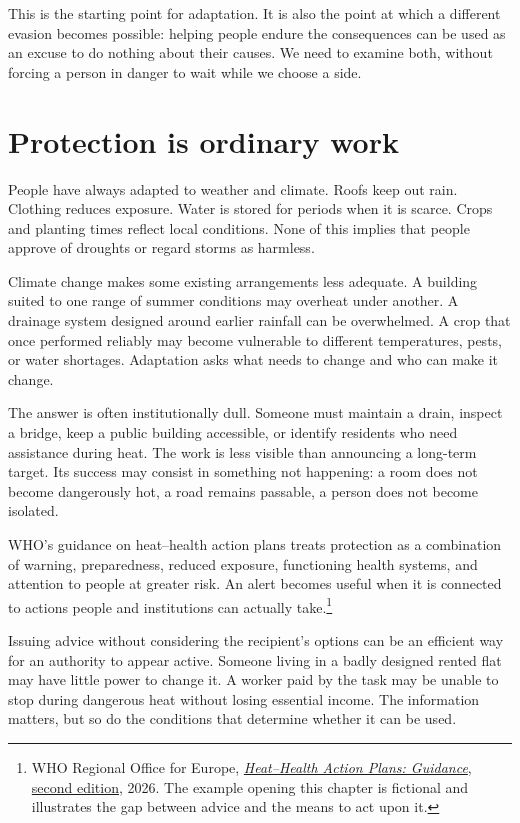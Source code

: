 \documentclass[12pt,a4paper]{book}
\begin{document}
This is the starting point for adaptation. It is also the point at which a different evasion becomes possible: helping people endure the consequences can be used as an excuse to do nothing about their causes. We need to examine both, without forcing a person in danger to wait while we choose a side.

\section*{Protection is ordinary work}

People have always adapted to weather and climate. Roofs keep out rain. Clothing reduces exposure. Water is stored for periods when it is scarce. Crops and planting times reflect local conditions. None of this implies that people approve of droughts or regard storms as harmless.

Climate change makes some existing arrangements less adequate. A building suited to one range of summer conditions may overheat under another. A drainage system designed around earlier rainfall can be overwhelmed. A crop that once performed reliably may become vulnerable to different temperatures, pests, or water shortages. Adaptation asks what needs to change and who can make it change.

The answer is often institutionally dull. Someone must maintain a drain, inspect a bridge, keep a public building accessible, or identify residents who need assistance during heat. The work is less visible than announcing a long-term target. Its success may consist in something not happening: a room does not become dangerously hot, a road remains passable, a person does not become isolated.

WHO's guidance on heat--health action plans treats protection as a combination of warning, preparedness, reduced exposure, functioning health systems, and attention to people at greater risk. An alert becomes useful when it is connected to actions people and institutions can actually take.\footnote{WHO Regional Office for Europe, \href{https://www.who.int/europe/publications/i/item/9789289062930}{\emph{Heat--Health Action Plans: Guidance}, second edition}, 2026. The example opening this chapter is fictional and illustrates the gap between advice and the means to act upon it.}

Issuing advice without considering the recipient's options can be an efficient way for an authority to appear active. Someone living in a badly designed rented flat may have little power to change it. A worker paid by the task may be unable to stop during dangerous heat without losing essential income. The information matters, but so do the conditions that determine whether it can be used.
\end{document}
